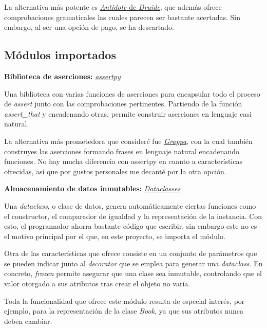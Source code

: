 La alternativa más potente es \href{https://www.antidote.info/en/}{\textit{Antidote} de \textit{Druide}}, que además ofrece comprobaciones gramaticales las cuales parecen ser bastante acertadas. Sin embargo, al ser una opción de pago, se ha descartado.

\subsection{Módulos importados}

\textbf{Biblioteca de aserciones:} \href{https://github.com/assertpy/assertpy}{\textit{assertpy}}

Una biblioteca con varias funciones de aserciones para encapsular todo el proceso de \textit{assert} junto con las comprobaciones pertinentes. Partiendo de la función \textit{assert\_that} y encadenando otras, permite construir aserciones en lenguaje casi natural.

La alternativa más prometedora que consideré fue \href{https://github.com/grappa-py/grappa}{\textit{Grappa}}, con la cual también construyes las aserciones formando frases en lenguaje natural encadenando funciones. No hay mucha diferencia con assertpy en cuanto a características ofrecidas, así que por gustos personales me decanté por la otra opción.

\textbf{Almacenamiento de datos inmutables:} \href{https://docs.python.org/3/library/dataclasses.html}{\textit{Dataclasses}}

Una \textit{dataclass}, o clase de datos, genera automáticamente ciertas funciones como el constructor, el comparador de igualdad y la representación de la instancia. Con esto, el programador ahorra bastante código que escribir, sin embargo este no es el motivo principal por el que, en este proyecto, se importa el módulo.

Otra de las características que ofrece consiste en un conjunto de parámetros que se pueden indicar junto al \textit{decorator} que se emplea para generar una \textit{dataclass}. En concreto, \textit{frozen} permite asegurar que una clase sea inmutable, controlando que el valor otorgado a sus atributos tras crear el objeto no varía.

Toda la funcionalidad que ofrece este módulo resulta de especial interés, por ejemplo, para la representación de la clase \textit{Book}, ya que sus atributos nunca deben cambiar.